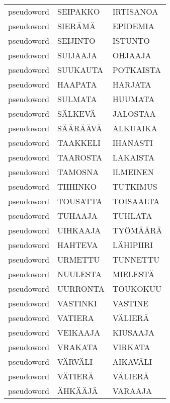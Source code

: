 \begin{tabular}{lll}
 pseudoword &   SEIPAKKO &      IRTISANOA \\
 pseudoword &    SIERÄMÄ &       EPIDEMIA \\
 pseudoword &   SEIJINTO &        ISTUNTO \\
 pseudoword &   SUIJAAJA &        OHJAAJA \\
 pseudoword &   SUUKAUTA &      POTKAISTA \\
 pseudoword &    HAAPATA &        HARJATA \\
 pseudoword &    SULMATA &        HUUMATA \\
 pseudoword &    SÄLKEVÄ &       JALOSTAA \\
 pseudoword &   SÄÄRÄÄVÄ &       ALKUAIKA \\
 pseudoword &   TAAKKELI &       IHANASTI \\
 pseudoword &   TAAROSTA &       LAKAISTA \\
 pseudoword &    TAMOSNA &       ILMEINEN \\
 pseudoword &   TIIHINKO &       TUTKIMUS \\
 pseudoword &   TOUSATTA &      TOISAALTA \\
 pseudoword &    TUHAAJA &        TUHLATA \\
 pseudoword &   UIHKAAJA &       TYÖMÄÄRÄ \\
 pseudoword &    HAHTEVA &      LÄHIPIIRI \\
 pseudoword &    URMETTU &       TUNNETTU \\
 pseudoword &   NUULESTA &       MIELESTÄ \\
 pseudoword &   UURRONTA &       TOUKOKUU \\
 pseudoword &   VASTINKI &        VASTINE \\
 pseudoword &    VATIERA &        VÄLIERÄ \\
 pseudoword &   VEIKAAJA &       KIUSAAJA \\
 pseudoword &    VRAKATA &        VIRKATA \\
 pseudoword &    VÄRVÄLI &       AIKAVÄLI \\
 pseudoword &    VÄTIERÄ &        VÄLIERÄ \\
 pseudoword &    ÄHKÄÄJÄ &        VARAAJA \\
\bottomrule
\end{tabular}
